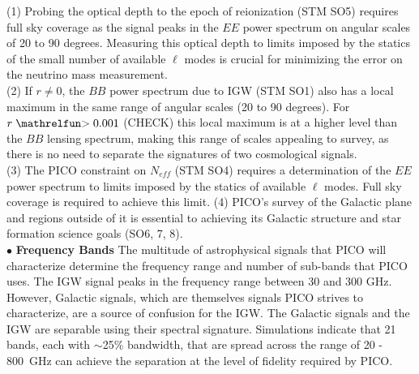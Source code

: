 \documentclass[PICOReport.tex]{subfiles}
\begin{document}
(1) Probing the optical depth to the epoch of reionization (STM SO5) requires full sky 
coverage as the signal peaks in the $EE$ power spectrum on angular scales of 20 to 90 degrees. Measuring 
this optical depth to limits imposed by the statics of the small number of available $\ell$ modes is crucial 
for minimizing the error on the neutrino mass measurement. \\   
(2) If $r \ne 0 $, the $BB$ power spectrum due to IGW (STM SO1) also has a local maximum in the same
range of angular scales (20 to 90 degrees). For $r \simgt 0.001$ (CHECK)
this local maximum is at a higher level than the $BB$ lensing spectrum, making this range of scales appealing 
to survey, as there is no need to separate the signatures of two cosmological signals. \\
(3) The PICO constraint on $N_{eff}$ (STM SO4) requires a determination of the $EE$ power spectrum to limits
imposed by the statics of available $\ell$ modes. Full sky coverage is required to achieve this limit.  
(4) PICO's survey of the Galactic plane and regions outside of it is essential to achieving its Galactic structure 
and star formation science goals (SO6, 7, 8). \\
%
$\bullet$ {\bf Frequency Bands} \hspace{0.1in} The multitude of astrophysical signals that PICO will characterize 
determine the frequency range and number of sub-bands that PICO uses. The IGW signal peaks 
in the frequency range between 30 and 300 GHz. However, Galactic signals, which are themselves signals PICO strives to 
characterize, are a source of confusion for the IGW. The Galactic signals and the IGW are separable using their 
spectral signature. Simulations indicate that 21 bands, each with $\sim$25\% bandwidth, that are spread across 
the range of 20 - 800~GHz can achieve the separation at the level of fidelity required by PICO. 
\end{document}

